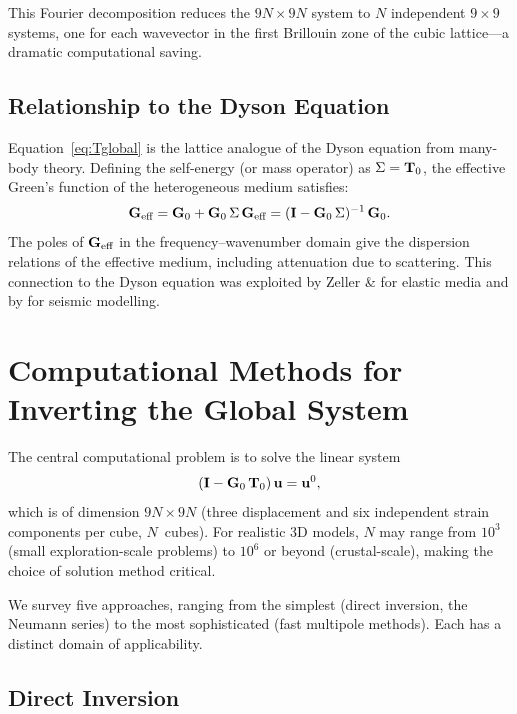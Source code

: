This Fourier decomposition reduces the $9N\times 9N$ system to $N$
independent $9\times 9$ systems, one for each wavevector in the first
Brillouin zone of the cubic lattice---a dramatic computational saving.

\subsection{Relationship to the Dyson Equation}

Equation~\eqref{eq:Tglobal} is the lattice analogue of the Dyson equation
from many-body theory.  Defining the self-energy (or mass operator) as
$\Sigma = \mathbf{T}_0$, the effective Green's function of the heterogeneous
medium satisfies:
\begin{equation}
  \mathbf{G}_{\text{eff}} = \mathbf{G}_0 + \mathbf{G}_0\,\Sigma\,\mathbf{G}_{\text{eff}}
  = (\mathbf{I} - \mathbf{G}_0\,\Sigma)^{-1}\,\mathbf{G}_0.
\label{eq:Dyson}
\end{equation}
The poles of $\mathbf{G}_{\text{eff}}$ in the frequency--wavenumber domain give the
dispersion relations of the effective medium, including attenuation due to
scattering.  This connection to the Dyson equation was exploited by Zeller
\& \citet{ZellerDederichs1973} for elastic media and by
\citet{Jakobsen2012} for seismic modelling.


\section{Computational Methods for Inverting the Global System}

The central computational problem is to solve the linear system
\begin{equation}
  (\mathbf{I} - \mathbf{G}_0\,\mathbf{T}_0)\,\mathbf{u} = \mathbf{u}^0,
\label{eq:globalsys}
\end{equation}
which is of dimension $9N\times 9N$ (three displacement and six independent
strain components per cube, $N$~cubes).  For realistic 3D models, $N$ may
range from $10^3$ (small exploration-scale problems) to $10^6$ or beyond
(crustal-scale), making the choice of solution method critical.

We survey five approaches, ranging from the simplest (direct inversion, the
Neumann series) to the most sophisticated (fast multipole methods).  Each
has a distinct domain of applicability.

\subsection{Direct Inversion}

